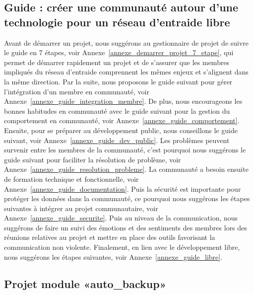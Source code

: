 \subsection{Guide : créer une communauté autour d’une technologie pour un réseau d’entraide libre}


Avant de démarrer un projet, nous suggérons au gestionnaire de projet de suivre le guide en 7 étapes, voir Annexe~\ref{annexe_demarrer_projet_7_etape}, qui permet de démarrer rapidement un projet et de s'assurer que les membres impliqués du réseau d'entraide comprennent les mêmes enjeux et s'alignent dans la même direction. Par la suite, nous proposons le guide suivant pour gérer l'intégration d'un membre en communauté, voir Annexe~\ref{annexe_guide_integration_membre}. De plus, nous encourageons les bonnes habitudes en communauté avec le guide suivant pour la gestion du comportement en communauté, voir Annexe~\ref{annexe_guide_comportement}. Ensuite, pour se préparer au développement public, nous conseillons le guide suivant, voir Annexe~\ref{annexe_guide_dev_public}. Les problèmes peuvent survenir entre les membres de la communauté, c'est pourquoi nous suggérons le guide suivant pour faciliter la résolution de problème, voir Annexe~\ref{annexe_guide_resolution_probleme}. La communauté a besoin ensuite de formation technique et fonctionnelle, voir Annexe~\ref{annexe_guide_documentation}. Puis la sécurité est importante pour protéger les données dans la communauté, ce pourquoi nous suggérons les étapes suivantes à intégrer au projet communautaire, voir Annexe~\ref{annexe_guide_securite}. Puis au niveau de la communication, nous suggérons de faire un suivi des émotions et des sentiments des membres lors des réunions relatives au projet et mettre en place des outils favorisant la communication non violente. Finalement, en lien avec le développement libre, nous suggérons les étapes suivantes, voir Annexe~\ref{annexe_guide_libre}.


\subsection{Projet module «auto\_backup»}

